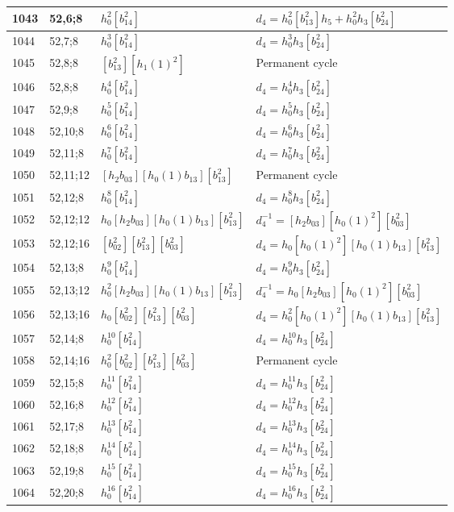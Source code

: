 \documentclass{article}
\begin{document}
\begin{longtable}{|l|l|>{\raggedright\arraybackslash}p{6cm}|>{\raggedright\arraybackslash}p{6cm}|}
\hline
1043 & 52,6;8 & $h_0^2[b_{14}^2]$ &$d_{4}=h_0^2[b_{13}^2]h_5 + h_0^2h_3[b_{24}^2]$\\
\hline
1044 & 52,7;8 & $h_0^3[b_{14}^2]$ &$d_{4}=h_0^3h_3[b_{24}^2]$\\
\hline
1045 & 52,8;8 & $[b_{13}^2][h_1(1)^2]$ & Permanent cycle\\
1046 & 52,8;8 & $h_0^4[b_{14}^2]$ &$d_{4}=h_0^4h_3[b_{24}^2]$\\
\hline
1047 & 52,9;8 & $h_0^5[b_{14}^2]$ &$d_{4}=h_0^5h_3[b_{24}^2]$\\
\hline
1048 & 52,10;8 & $h_0^6[b_{14}^2]$ &$d_{4}=h_0^6h_3[b_{24}^2]$\\
\hline
1049 & 52,11;8 & $h_0^7[b_{14}^2]$ &$d_{4}=h_0^7h_3[b_{24}^2]$\\
\hline
1050 & 52,11;12 & $[h_2b_{03}][h_0(1)b_{13}][b_{13}^2]$ & Permanent cycle\\
\hline
1051 & 52,12;8 & $h_0^8[b_{14}^2]$ &$d_{4}=h_0^8h_3[b_{24}^2]$\\
\hline
1052 & 52,12;12 & $h_0[h_2b_{03}][h_0(1)b_{13}][b_{13}^2]$ & $d_{4}^{-1}=[h_2b_{03}][h_0(1)^2][b_{03}^2]$\\
\hline
1053 & 52,12;16 & $[b_{02}^2][b_{13}^2][b_{03}^2]$ &$d_{4}=h_0[h_0(1)^2][h_0(1)b_{13}][b_{13}^2]$\\
\hline
1054 & 52,13;8 & $h_0^9[b_{14}^2]$ &$d_{4}=h_0^9h_3[b_{24}^2]$\\
\hline
1055 & 52,13;12 & $h_0^2[h_2b_{03}][h_0(1)b_{13}][b_{13}^2]$ & $d_{4}^{-1}=h_0[h_2b_{03}][h_0(1)^2][b_{03}^2]$\\
\hline
1056 & 52,13;16 & $h_0[b_{02}^2][b_{13}^2][b_{03}^2]$ &$d_{4}=h_0^2[h_0(1)^2][h_0(1)b_{13}][b_{13}^2]$\\
\hline
1057 & 52,14;8 & $h_0^{10}[b_{14}^2]$ &$d_{4}=h_0^{10}h_3[b_{24}^2]$\\
\hline
1058 & 52,14;16 & $h_0^2[b_{02}^2][b_{13}^2][b_{03}^2]$ & Permanent cycle\\
\hline
1059 & 52,15;8 & $h_0^{11}[b_{14}^2]$ &$d_{4}=h_0^{11}h_3[b_{24}^2]$\\
\hline
1060 & 52,16;8 & $h_0^{12}[b_{14}^2]$ &$d_{4}=h_0^{12}h_3[b_{24}^2]$\\
\hline
1061 & 52,17;8 & $h_0^{13}[b_{14}^2]$ &$d_{4}=h_0^{13}h_3[b_{24}^2]$\\
\hline
1062 & 52,18;8 & $h_0^{14}[b_{14}^2]$ &$d_{4}=h_0^{14}h_3[b_{24}^2]$\\
\hline
1063 & 52,19;8 & $h_0^{15}[b_{14}^2]$ &$d_{4}=h_0^{15}h_3[b_{24}^2]$\\
\hline
1064 & 52,20;8 & $h_0^{16}[b_{14}^2]$ &$d_{4}=h_0^{16}h_3[b_{24}^2]$\\

\end{longtable}
\end{document}
